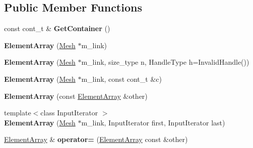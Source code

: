 \subsection*{Public Member Functions}
\begin{DoxyCompactItemize}
\item 
\hypertarget{classINMOST_1_1ElementArray_ae7800245fe85174f74b7663f142ce924}{const cont\-\_\-t \& {\bfseries Get\-Container} ()}\label{classINMOST_1_1ElementArray_ae7800245fe85174f74b7663f142ce924}

\item 
\hypertarget{classINMOST_1_1ElementArray_aae95f7c16f9abb5a846d0ab505cd96bd}{{\bfseries Element\-Array} (\hyperlink{classINMOST_1_1Mesh}{Mesh} $\ast$m\-\_\-link)}\label{classINMOST_1_1ElementArray_aae95f7c16f9abb5a846d0ab505cd96bd}

\item 
\hypertarget{classINMOST_1_1ElementArray_ab524156c027e8dd9bc1fcc1863539bc2}{{\bfseries Element\-Array} (\hyperlink{classINMOST_1_1Mesh}{Mesh} $\ast$m\-\_\-link, size\-\_\-type n, Handle\-Type h=Invalid\-Handle())}\label{classINMOST_1_1ElementArray_ab524156c027e8dd9bc1fcc1863539bc2}

\item 
\hypertarget{classINMOST_1_1ElementArray_a5d472c64c7292b1f0d5d11a2f7a9c986}{{\bfseries Element\-Array} (\hyperlink{classINMOST_1_1Mesh}{Mesh} $\ast$m\-\_\-link, const cont\-\_\-t \&c)}\label{classINMOST_1_1ElementArray_a5d472c64c7292b1f0d5d11a2f7a9c986}

\item 
\hypertarget{classINMOST_1_1ElementArray_a4a4fa5f1fb61b8f0bc5d28d5004235d5}{{\bfseries Element\-Array} (const \hyperlink{classINMOST_1_1ElementArray}{Element\-Array} \&other)}\label{classINMOST_1_1ElementArray_a4a4fa5f1fb61b8f0bc5d28d5004235d5}

\item 
\hypertarget{classINMOST_1_1ElementArray_a989a65d8b61736d0e8785977243670dc}{{\footnotesize template$<$class Input\-Iterator $>$ }\\{\bfseries Element\-Array} (\hyperlink{classINMOST_1_1Mesh}{Mesh} $\ast$m\-\_\-link, Input\-Iterator first, Input\-Iterator last)}\label{classINMOST_1_1ElementArray_a989a65d8b61736d0e8785977243670dc}

\item 
\hypertarget{classINMOST_1_1ElementArray_af53c7ec0f355c3040d01f70071202491}{\hyperlink{classINMOST_1_1ElementArray}{Element\-Array} \& {\bfseries operator=} (\hyperlink{classINMOST_1_1ElementArray}{Element\-Array} const \&other)}\label{classINMOST_1_1ElementArray_af53c7ec0f355c3040d01f70071202491}


\end{DoxyCompactItemize}
